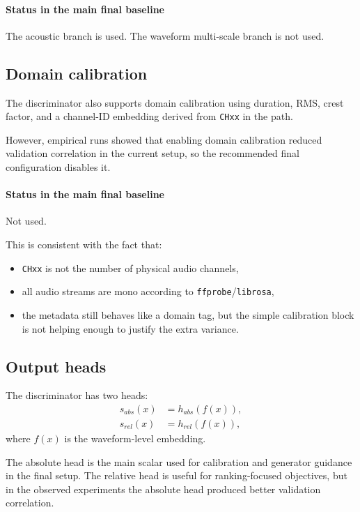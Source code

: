 \documentclass[11pt]{article}
\begin{document}
\paragraph{Status in the main final baseline}
The acoustic branch is used. The waveform multi-scale branch is not used.

\subsection{Domain calibration}
The discriminator also supports domain calibration using duration, RMS, crest factor, and a channel-ID embedding derived from \texttt{CHxx} in the path.

However, empirical runs showed that enabling domain calibration reduced validation correlation in the current setup, so the recommended final configuration disables it.

\paragraph{Status in the main final baseline}
Not used.

This is consistent with the fact that:
\begin{itemize}[leftmargin=*]
    \item \texttt{CHxx} is not the number of physical audio channels,
    \item all audio streams are mono according to \texttt{ffprobe}/\texttt{librosa},
    \item the metadata still behaves like a domain tag, but the simple calibration block is not helping enough to justify the extra variance.
\end{itemize}

\subsection{Output heads}
The discriminator has two heads:
\begin{align}
    s_{abs}(x) &= h_{abs}(f(x)), \\
    s_{rel}(x) &= h_{rel}(f(x)),
\end{align}
where $f(x)$ is the waveform-level embedding.

The absolute head is the main scalar used for calibration and generator guidance in the final setup. The relative head is useful for ranking-focused objectives, but in the observed experiments the absolute head produced better validation correlation.
\end{document}
